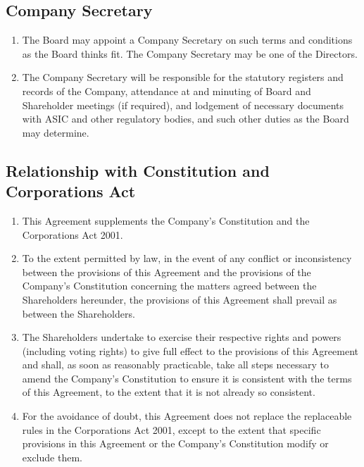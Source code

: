 \subsection{Company Secretary}
\begin{enumerate}[label=(\alph*), wide, labelwidth=!, labelindent=0pt]
\item The Board may appoint a Company Secretary on such terms and conditions as the Board thinks fit. The Company Secretary may be one of the Directors.
\item The Company Secretary will be responsible for the statutory registers and records of the Company, attendance at and minuting of Board and Shareholder meetings (if required), and lodgement of necessary documents with ASIC and other regulatory bodies, and such other duties as the Board may determine.
\end{enumerate}

\subsection{Relationship with Constitution and Corporations Act}
\begin{enumerate}[label=(\alph*), wide, labelwidth=!, labelindent=0pt]
\item This Agreement supplements the Company's Constitution and the Corporations Act 2001. 
\item To the extent permitted by law, in the event of any conflict or inconsistency between the provisions of this Agreement and the provisions of the Company's Constitution concerning the matters agreed between the Shareholders hereunder, the provisions of this Agreement shall prevail as between the Shareholders.
\item The Shareholders undertake to exercise their respective rights and powers (including voting rights) to give full effect to the provisions of this Agreement and shall, as soon as reasonably practicable, take all steps necessary to amend the Company's Constitution to ensure it is consistent with the terms of this Agreement, to the extent that it is not already so consistent.
\item For the avoidance of doubt, this Agreement does not replace the replaceable rules in the Corporations Act 2001, except to the extent that specific provisions in this Agreement or the Company's Constitution modify or exclude them.
\end{enumerate} 